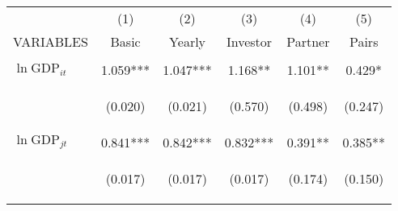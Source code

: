 \begin{center}
\begin{tabular}{lccccc} \hline
 & (1) & (2) & (3) & (4) & (5) \\
VARIABLES & Basic & Yearly & Investor & Partner & Pairs \\ \hline
\vspace{4pt} & \begin{footnotesize}\end{footnotesize} & \begin{footnotesize}\end{footnotesize} & \begin{footnotesize}\end{footnotesize} & \begin{footnotesize}\end{footnotesize} & \begin{footnotesize}\end{footnotesize} \\
$\ln\text{GDP}_{it}$ & 1.059*** & 1.047*** & 1.168** & 1.101** & 0.429* \\
\vspace{4pt} & \begin{footnotesize}(0.020)\end{footnotesize} & \begin{footnotesize}(0.021)\end{footnotesize} & \begin{footnotesize}(0.570)\end{footnotesize} & \begin{footnotesize}(0.498)\end{footnotesize} & \begin{footnotesize}(0.247)\end{footnotesize} \\
$\ln\text{GDP}_{jt}$ & 0.841*** & 0.842*** & 0.832*** & 0.391** & 0.385** \\
\vspace{4pt} & \begin{footnotesize}(0.017)\end{footnotesize} & \begin{footnotesize}(0.017)\end{footnotesize} & \begin{footnotesize}(0.017)\end{footnotesize} & \begin{footnotesize}(0.174)\end{footnotesize} & \begin{footnotesize}(0.150)\end{footnotesize} \\

\end{tabular}
\end{center}
